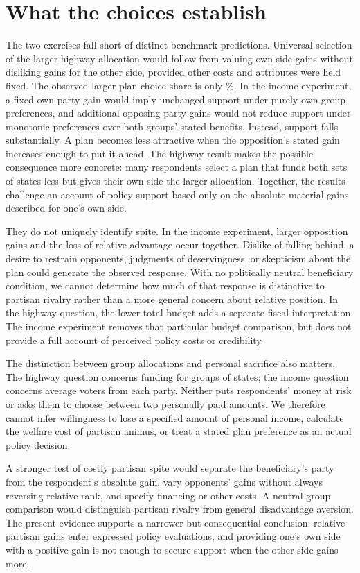 \documentclass[11pt]{article}
\begin{document}
\section{What the choices establish}
The two exercises fall short of distinct benchmark predictions. Universal selection of the larger highway allocation would follow from valuing own-side gains without disliking gains for the other side, provided other costs and attributes were held fixed. The observed larger-plan choice share is only \HighwayPoolLarger{}\%. In the income experiment, a fixed own-party gain would imply unchanged support under purely own-group preferences, and additional opposing-party gains would not reduce support under monotonic preferences over both groups' stated benefits. Instead, support falls substantially. A plan becomes less attractive when the opposition's stated gain increases enough to put it ahead. The highway result makes the possible consequence more concrete: many respondents select a plan that funds both sets of states less but gives their own side the larger allocation. Together, the results challenge an account of policy support based only on the absolute material gains described for one's own side.

They do not uniquely identify spite. In the income experiment, larger opposition gains and the loss of relative advantage occur together. Dislike of falling behind, a desire to restrain opponents, judgments of deservingness, or skepticism about the plan could generate the observed response. With no politically neutral beneficiary condition, we cannot determine how much of that response is distinctive to partisan rivalry rather than a more general concern about relative position. In the highway question, the lower total budget adds a separate fiscal interpretation. The income experiment removes that particular budget comparison, but does not provide a full account of perceived policy costs or credibility.

The distinction between group allocations and personal sacrifice also matters. The highway question concerns funding for groups of states; the income question concerns average voters from each party. Neither puts respondents' money at risk or asks them to choose between two personally paid amounts. We therefore cannot infer willingness to lose a specified amount of personal income, calculate the welfare cost of partisan animus, or treat a stated plan preference as an actual policy decision.

A stronger test of costly partisan spite would separate the beneficiary's party from the respondent's absolute gain, vary opponents' gains without always reversing relative rank, and specify financing or other costs. A neutral-group comparison would distinguish partisan rivalry from general disadvantage aversion. The present evidence supports a narrower but consequential conclusion: relative partisan gains enter expressed policy evaluations, and providing one's own side with a positive gain is not enough to secure support when the other side gains more.
\end{document}
